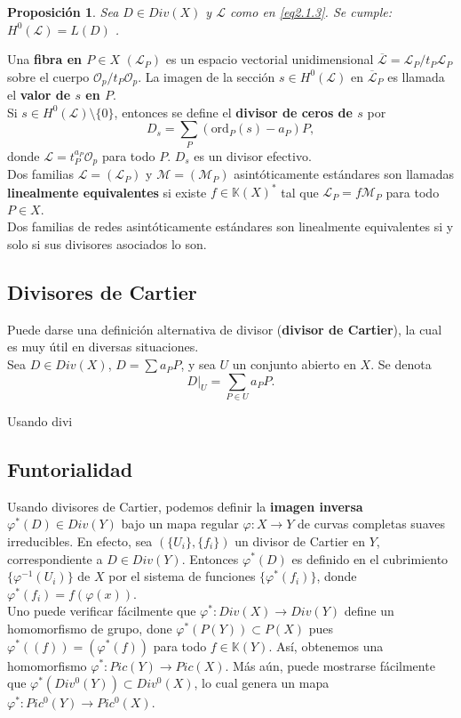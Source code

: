 \documentclass[12pt,a4paper]{report}
\newcommand{\Op}{\mathscr{O}_{p}}
\newcommand{\K}{\mathbb{K}}
\newcommand{\ordp}{\mbox{ord}_{P}}
\newcommand{\Li}{\mathscr{L}}
\newcommand{\M}{\mathscr{M}}
\newtheorem{prop}{Proposición}[chapter]
\begin{document}
\begin{prop}
	Sea $D \in Div(X)$ y $\Li$ como en \ref{eq2.1.3}. Se cumple: $H^{0}(\Li) = L (D)$ .
\end{prop}

Una \textbf{fibra en $P \in X$} $(\Li_{P})$ es un espacio vectorial unidimensional $\overline{\Li}= \Li_{P} /t_{P} \Li_{P}  $ sobre el cuerpo $\Op / t_{P} \Op$. La imagen de la sección $s \in H^{0}(\Li)$ en $ \overline{\Li}_{P} $ es llamada el \textbf{valor de $s$ en $P$}.\\
Si $s \in H^{0} ( \Li) \setminus \{0\}$, entonces se define el \textbf{divisor de ceros de $s$} por $$ D_{s} = \sum_{P} (\ordp (s) -a_{P} )P, $$ donde $\Li= t_{P} ^{a_{P}} \Op$ para todo $P$. $D_{s}$ es un divisor efectivo.\\

Dos familias $\Li = (\Li_{P})$ y $\M = (\M_{P})$ asintóticamente estándares son llamadas \textbf{linealmente equivalentes} si existe $f \in \K(X)^{*}$ tal que $ \Li_{P} = f \M _{P} $ para todo $P \in X$.\\
Dos familias de redes asintóticamente estándares son linealmente equivalentes si y solo si sus divisores asociados lo son.


\subsection{Divisores de Cartier} 
Puede darse una definición alternativa de divisor (\textbf{divisor de Cartier}), la cual es muy útil en diversas situaciones.\\
Sea $D \in Div (X)$, $D= \sum a_{P} P$, y sea $U$ un conjunto abierto en $X$. Se denota $$D|_{U}= \sum_{P \in U} a_{P} P .$$

Usando divi






\subsection{Funtorialidad}
Usando divisores de Cartier, podemos definir la \textbf{imagen inversa} $\varphi ^{*}(D) \in  Div(Y)$ bajo un mapa regular $\varphi:  X \rightarrow Y $ de curvas completas suaves irreducibles. En efecto, sea $(\{ U_{i}\} , \{f_{i}\} )$ un divisor de Cartier en $Y$, correspondiente a $D \in Div (Y)$. Entonces $\varphi^{*}(D)$ es definido en el cubrimiento $ \{ \varphi ^{-1}(U_{i})  \} $ de $X$ por el sistema de funciones $\{ \varphi^{*} (f_{i}) \}$, donde $\varphi ^{*} (f_{i}) = f (\varphi(x))$. \\
Uno puede verificar fácilmente que $\varphi^{*}:Div(X) \rightarrow Div (Y)$ define un homomorfismo de grupo, done $\varphi^{*} (P(Y)) \subset P(X) $ pues $\varphi^{*}((f)) = (\varphi ^{*} (f))$ para todo $f \in \K(Y)$. Así, obtenemos una homomorfismo $\varphi^{*}: Pic (Y) \rightarrow Pic (X)$. Más aún, puede mostrarse fácilmente que $\varphi ^{*} (Div ^{0}(Y)) \subset Div ^{0} (X) $, lo cual genera un mapa $\varphi ^{*}: Pic ^{0} (Y) \rightarrow Pic ^{0}(X)$.\\
\end{document}
